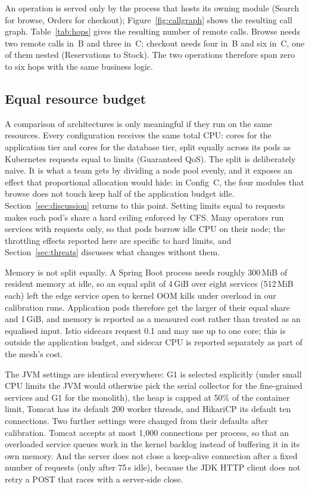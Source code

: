 

An operation is served only by the process that hosts its owning module (Search for browse, Orders for
checkout); Figure~\ref{fig:callgraph} shows the resulting call graph. Table~\ref{tab:hops} gives the resulting number of remote calls. Browse needs two remote calls
in~B and three in~C; checkout needs four in~B and six in~C, one of them nested (Reservations to Stock).
The two operations therefore span zero to six hops with the same business logic.

\subsection{Equal resource budget}
\label{sec:budget}

A comparison of architectures is only meaningful if they run on the same resources. Every configuration
receives the same total CPU:  cores for the application tier and  cores for the
database tier, split equally across its pods as Kubernetes requests equal to limits (Guaranteed QoS).
The split is deliberately naive. It is what a team gets by dividing a node pool evenly, and it exposes an
effect that proportional allocation would hide: in Config~C, the four modules that browse does not touch
keep half of the application budget idle. Section~\ref{sec:discussion} returns to this point. Setting limits
equal to requests makes each pod's share a hard ceiling enforced by CFS. Many operators run services with
requests only, so that pods borrow idle CPU on their node; the throttling effects reported here are specific to
hard limits, and Section~\ref{sec:threats} discusses what changes without them.

Memory is not split equally. A Spring Boot process needs roughly 300\,MiB of resident memory at idle, so an
equal split of 4\,GiB over eight services (512\,MiB each) left the edge service open to kernel OOM kills under
overload in our calibration runs. Application pods therefore get the larger of their equal share and
1\,GiB, and memory is reported as a measured cost rather than treated as an equalised input. Istio sidecars
request 0.1 and may use up to one core; this is outside the application budget, and sidecar CPU is reported
separately as part of the mesh's cost.

The JVM settings are identical everywhere: G1 is selected explicitly (under small CPU limits the JVM would
otherwise pick the serial collector for the fine-grained services and G1 for the monolith), the heap is capped
at 50\% of the container limit, Tomcat has its default 200 worker threads, and HikariCP its default ten
connections. Two further settings were changed from their defaults after calibration. Tomcat accepts at most 1{,}000
connections per process, so that an overloaded service queues work in the kernel backlog instead of buffering it
in its own memory. And the server does not close a keep-alive connection after a fixed number of requests (only
after 75\,s idle), because the JDK HTTP client does not retry a POST that races with a server-side close.

